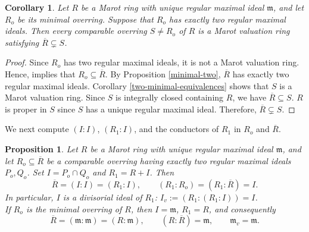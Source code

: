 \documentclass[12pt]{article}
\newtheorem{proposition}{Proposition}
\newtheorem{corollary}{Corollary}
\begin{document}
\begin{corollary}\label{two-minimal-other-comparables}
		Let $R$ be a Marot ring with unique regular maximal ideal $\mathfrak{m}$, and let $R_o$ be its minimal overring. Suppose that $R_o$ has exactly two regular maximal ideals. Then every comparable overring $S\neq R_o$ of $R$ is a Marot valuation ring satisfying $\overline R\subsetneq S$.
	\end{corollary}
	\begin{proof}
        Since $R_o$ has two regular maximal ideals, it is not a Marot valuation ring. Hence, \cite[Proposition 3.2]{marot} implies that $R_o\subseteq\overline R$. By Proposition \ref{minimal-two}, $\overline R$ has exactly two regular maximal ideals. Corollary \ref{two-minimal-equivalences} shows that $S$ is a Marot valuation ring. Since $S$ is integrally closed containing $R$, we have $\overline R\subseteq S$. $R$ is proper in $S$ since $S$ has a unique regular maximal ideal. Therefore, $\overline R\subsetneq S$.
    \end{proof}

We next compute $(I:I)$, $(R_1:I)$, and the conductors of $R_1$ in $R_o$ and $\overline R$.

\begin{proposition}\label{two-colon}
		Let $R$ be a Marot ring with unique regular maximal ideal $\mathfrak{m}$, and let $R_o\subseteq\overline R$ be a comparable overring having exactly two regular maximal
		ideals $P_o,Q_o$. Set $I=P_o\cap Q_o$ and $R_1=R+I$. Then
		\[
		\overline R=(I:I)=(R_1:I),\qquad
		(R_1:R_o)=(R_1:\overline R)=I.
		\]
		In particular, $I$ is a divisorial ideal of $R_1$: $ I_v:=(R_1:(R_1:I))=I$. \\ If $R_o$ is the minimal overring of $R$, then
		$I=\mathfrak{m}$, $R_1=R$, and consequently
		\[
		\overline R=(\mathfrak{m}:\mathfrak{m})=(R:\mathfrak{m}),
		\qquad (R:\overline R)=\mathfrak{m},
		\qquad \mathfrak{m}_v=\mathfrak{m}.
		\]
	\end{proposition}
	
\end{document}
